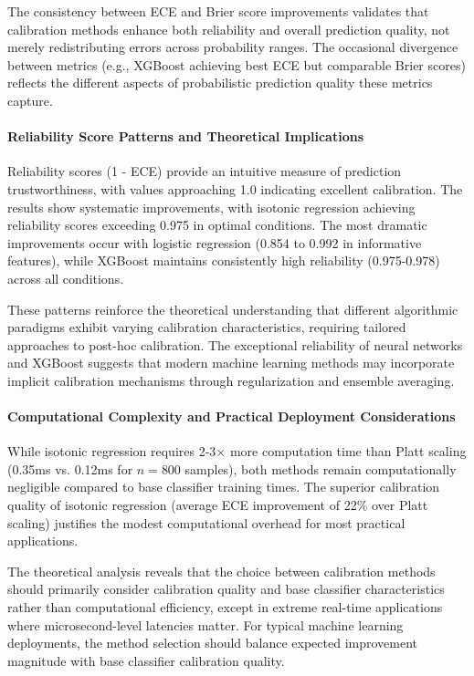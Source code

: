 \documentclass[12pt, a4paper]{article}
\begin{document}
The consistency between ECE and Brier score improvements validates that calibration methods enhance both reliability and overall prediction quality, not merely redistributing errors across probability ranges. The occasional divergence between metrics (e.g., XGBoost achieving best ECE but comparable Brier scores) reflects the different aspects of probabilistic prediction quality these metrics capture.

\paragraph{Reliability Score Patterns and Theoretical Implications}

Reliability scores (1 - ECE) provide an intuitive measure of prediction trustworthiness, with values approaching 1.0 indicating excellent calibration. The results show systematic improvements, with isotonic regression achieving reliability scores exceeding 0.975 in optimal conditions. The most dramatic improvements occur with logistic regression (0.854 to 0.992 in informative features), while XGBoost maintains consistently high reliability (0.975-0.978) across all conditions.

These patterns reinforce the theoretical understanding that different algorithmic paradigms exhibit varying calibration characteristics, requiring tailored approaches to post-hoc calibration. The exceptional reliability of neural networks and XGBoost suggests that modern machine learning methods may incorporate implicit calibration mechanisms through regularization and ensemble averaging.

\paragraph{Computational Complexity and Practical Deployment Considerations}

While isotonic regression requires 2-3× more computation time than Platt scaling (0.35ms vs. 0.12ms for $n=800$ samples), both methods remain computationally negligible compared to base classifier training times. The superior calibration quality of isotonic regression (average ECE improvement of 22\% over Platt scaling) justifies the modest computational overhead for most practical applications.

The theoretical analysis reveals that the choice between calibration methods should primarily consider calibration quality and base classifier characteristics rather than computational efficiency, except in extreme real-time applications where microsecond-level latencies matter. For typical machine learning deployments, the method selection should balance expected improvement magnitude with base classifier calibration quality.
\end{document}
